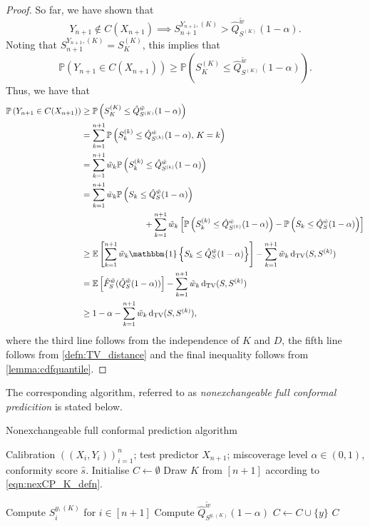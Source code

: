 \documentclass[11pt, titlepage]{article} %
\newcommand{\R}{\mathrm}
\newcommand{\Prob}[1]{\mathbb{P}\left( #1 \right)}
\newcommand{\Exp}[3]{\mathbb{E}\left#2 #1 \right#3}
\newcommand{\Ind}[1]{\mathbbm{1}\left\{ #1 \right\}}
\numberwithin{equation}{section}
\theoremstyle{definition}
\numberwithin{theorem}{section}
\numberwithin{lemma}{section}
\numberwithin{corollary}{section}
\numberwithin{proposition}{section}
\numberwithin{definition}{section}
\numberwithin{remark}{section}
\begin{document}
\begin{proof}
    \noindent
    So far, we have shown that \[Y_{n+1} \not \in C(X_{n+1}) \implies S_{n+1}^{Y_{n+1}, (K)} >\hat{Q}^{\tilde{w}}_{S^{(K)}}(1-\alpha).\] Noting that \(S_{n+1}^{Y_{n+1}, (K)} = S_K^{(K)}\), this implies that \[\Prob{Y_{n+1} \in C(X_{n+1}) } \geq \Prob{ S_K^{(K)} \leq \hat{Q}^{\tilde{w}}_{S^{(K)}}(1-\alpha) }. \]
    \noindent
    Thus, we have that
    \begin{align*}
        \Prob{Y_{n+1} \in C(X_{n+1})} &\geq \Prob{ S_K^{(K)} \leq \hat{Q}^{\tilde{w}}_{S^{(K)}}(1-\alpha) } \\
        &= \sum_{k=1}^{n+1} \Prob{S_k^{(k)} \leq \hat{Q}^{\tilde{w}}_{S^{(k)}}(1-\alpha), \, K=k} \\
        &= \sum_{k=1}^{n+1} \tilde{w}_k \Prob{S_k^{(k)} \leq \hat{Q}^{\tilde{w}}_{S^{(k)}}(1-\alpha)} \\
        &= \sum_{k=1}^{n+1} \tilde{w}_k \Prob{S_k \leq \hat{Q}^{\tilde{w}}_{S}(1-\alpha)} \\
        & \hspace{2.6cm} + \sum_{k=1}^{n+1} \tilde{w}_k \left[ \Prob{S_k^{(k)} \leq \hat{Q}^{\tilde{w}}_{S^{(k)}}(1-\alpha)} - \Prob{S_k \leq \hat{Q}^{\tilde{w}}_{S}(1-\alpha)} \right] \\
        &\geq \Exp{\sum_{k=1}^{n+1} \tilde{w}_k \Ind{S_k \leq \hat{Q}^{\tilde{w}}_{S}(1-\alpha)}}{[}{]} - \sum_{k=1}^{n+1} \tilde{w}_k \, \R{d_{TV}}(S, S^{(k)}) \\
        &= \Exp{\hat{F}^{\tilde{w}}_S(\hat{Q}^{\tilde{w}}_S (1-\alpha))}{[}{]} - \sum_{k=1}^{n+1} \tilde{w}_k \, \R{d_{TV}}(S, S^{(k)}) \\
        &\geq 1-\alpha - \sum_{k=1}^{n+1} \tilde{w}_k \, \R{d_{TV}}(S, S^{(k)}),
    \end{align*}
    where the third line follows from the independence of \(K\) and \(D\), the fifth line follows from \cref{defn:TV_distance} and the final inequality follows from \cref{lemma:cdfquantile}.
\end{proof}

\noindent
The corresponding algorithm, referred to as \textit{nonexchangeable full conformal predicition} is stated below.

\begin{algorithm}[H]
    \label{alg:nexCP}
    \caption{Nonexchangeable full conformal prediction algorithm}
    \begin{algorithmic}
        \Require Calibration \(((X_i, Y_i))_{i=1}^n\); test predictor \(X_{n+1}\); miscoverage level \(\alpha \in (0,1)\), conformity score \(\hat{s}\). 
        \State Initialise \(C \gets \emptyset\)
        \State Draw \(K\) from \([n+1]\) according to \eqref{eqn:nexCP_K_defn}.

            \State Compute \(S_i^{y, (K)}\) for \(i \in [n+1]\)
            \State Compute \(\hat{Q}^{\tilde{w}}_{S^{y, (K)}}(1-\alpha)\)
                \State \(C \gets C \cup \{y\}\)
            \EndIf
        \EndFor
        \Ensure \(C\)
    \end{algorithmic}
\end{algorithm}
\end{document}
